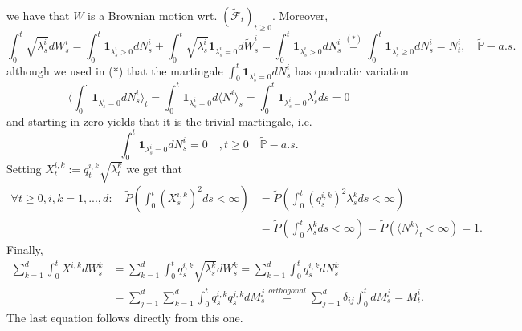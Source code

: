 \documentclass[a4paper,12pt,twoside]{article}
\begin{document}
{\[    \]
    we have that $W$ is a Brownian motion wrt. $(\tilde{\mathcal{F}}_t)_{t \geq 0}$. Moreover, 
    \[
    \int_0^t \sqrt{\lambda_s^i} dW_s^i = \int_0^t \textbf{1}_{\lambda_s^i >0} dN_s^i + \int_0^t \sqrt{\lambda_s^i} \textbf{1}_{\lambda_s^i =0} d \tilde{W}_s^i =\int_0^t \textbf{1}_{\lambda_s^i > 0} d N_s^i \stackrel{(*)}{=} \int_0^t \textbf{1}_{\lambda_s^i \geq 0} d N_s^i = N_t^i, \quad \tilde{\mathbb{P}}-a.s.
    \]
    although we used in (*) that the martingale $\int_0^t \textbf{1}_{\lambda_s^i =0} d N_s^i$ has quadratic variation 
    \[
    \langle \int_0^\cdot \textbf{1}_{\lambda_s^i =0} d N_s^i  \rangle_t = \int_0^t \textbf{1}_{\lambda_s^i =0} d\langle N^i\rangle_s = \int_0^t \textbf{1}_{\lambda_s^i =0}  \lambda_s^i ds =0
    \]
    and starting in zero yields that it is the trivial martingale, i.e. 
    \[
    \int_0^t \textbf{1}_{\lambda_s^i =0} d N_s^i=0 \quad, t \geq 0\quad \tilde{\mathbb{P}}-a.s.
    \]
    Setting $X_t^{i,k} := q_t^{i,k} \sqrt{\lambda_t^k}$ we get that 
    \begin{align*}
        \forall t \geq 0, i,k=1,...,d: \quad \tilde{P}( \int_0^t (X_s^{i,k})^2 ds < \infty )&= \tilde{P}( \int_0^t (q_s^{i,k})^2 \lambda_s^k ds < \infty) \\
        &= \tilde{P}( \int_0^t \lambda_s^k ds < \infty )= \tilde{P}( \langle N^k \rangle_t < \infty)=1.
    \end{align*}
    Finally, 
    \begin{align*}
        \sum_{k=1}^d \int_0^t X^{i,k} dW_s^k &= \sum_{k=1}^d \int_0^t q_s^{i,k} \sqrt{\lambda_s^k} dW_s^k = \sum_{k=1}^d \int_0^t q_s^{i,k} dN_s^k \\
        &=\sum_{j=1}^d \sum_{k=1}^d \int_0^t q_s^{i,k} q_s^{j,k} dM_s^j \stackrel{orthogonal}{=} \sum_{j=1}^d \delta_{ij} \int_0^t dM_s^j = M_t^i.
    \end{align*}
    The last equation follows directly from this one.
}
\end{document}
